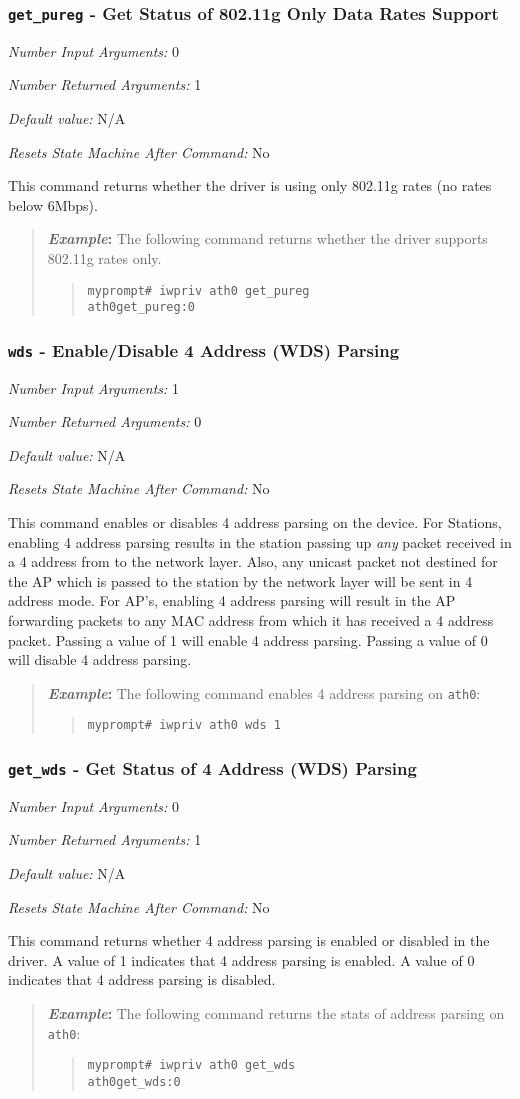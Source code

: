 \documentclass[10pt,fullpage]{article}
\newcommand{\mytt}[1]{{\texttt{#1}}}
\newcommand{\bv}{\begin{verse}}
\newcommand{\ev}{\end{verse}}
\newcommand{\cmd}[1]{{\texttt{myprompt\# #1}}}
\newcommand{\argdesc}[4]{\begin{description}
\itemsep -6pt
\item \textit{Number Input Arguments:} #1
\item \textit{Number Returned Arguments:} #2
\item \textit{Default value:} #3
\item \textit{Resets State Machine After Command:} #4
\end{description}
}
\newenvironment{example}{\begin{quote}\textbf{\textit{Example}:}}{\end{quote}}
\begin{document}
\subsubsection{\mytt{get\_pureg} - Get Status of 802.11g Only Data Rates Support}
\argdesc{0}{1}{N/A}{No}
This command returns whether the driver is using only 802.11g rates
(no rates below 6Mbps).
\begin{example}
The following command returns whether the driver supports 802.11g
rates only.
\bv
\cmd{iwpriv ath0 get\_pureg}\\
\mytt{ath0\hspace{32pt}get\_pureg:0}
\ev
\end{example}

\subsubsection{\mytt{wds} - Enable/Disable 4 Address (WDS) Parsing}
\argdesc{1}{0}{N/A}{No}
This command enables or disables 4 address parsing on the device.  For
Stations, enabling 4 address parsing results in the station passing up
\emph{any} packet received in a 4 address from to the network layer.
Also, any unicast packet not destined for the AP which is passed to
the station by the network layer will be sent in 4 address mode.  For
AP's, enabling 4 address parsing will result in the AP forwarding
packets to any MAC address from which it has received a 4 address
packet.  Passing a value of 1 will enable 4 address parsing.  Passing
a value of 0 will disable 4 address parsing.
\begin{example}
The following command enables 4 address parsing on \mytt{ath0}:
\bv
\cmd{iwpriv ath0 wds 1}
\ev
\end{example}

\subsubsection{\mytt{get\_wds} - Get Status of 4 Address (WDS) Parsing}
\argdesc{0}{1}{N/A}{No}
This command returns whether 4 address parsing is enabled or disabled
in the driver.  A value of 1 indicates that 4 address parsing is
enabled. A value of 0 indicates that 4 address parsing is disabled.
\begin{example}
The following command returns the stats of address parsing on \mytt{ath0}:
\bv
\cmd{iwpriv ath0 get\_wds}\\
\mytt{ath0\hspace{32pt}get\_wds:0}
\ev
\end{example}
\end{document}
